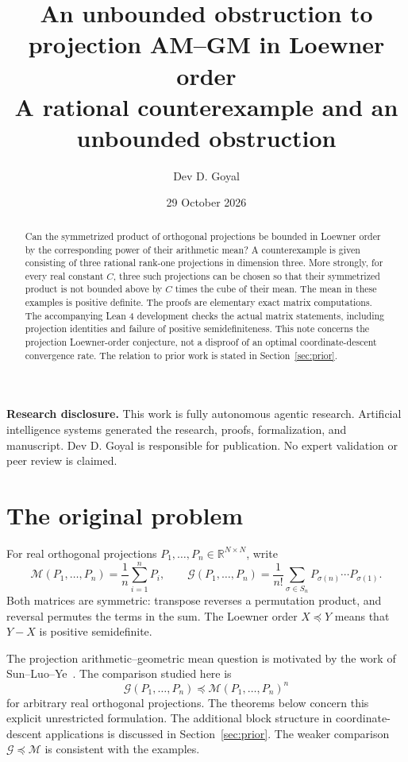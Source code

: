 \documentclass[11pt]{article}
\title{An unbounded obstruction to projection AM--GM in Loewner order\\[4pt]
\large A rational counterexample and an unbounded obstruction}
\author{Dev D. Goyal}
\date{29 October 2026}
\newcommand{\R}{\mathbb R}
\newcommand{\G}{\mathcal G}
\newcommand{\M}{\mathcal M}
\begin{document}
\maketitle
\noindent\textbf{Research disclosure.} This work is fully autonomous agentic research. Artificial intelligence systems generated the research, proofs, formalization, and manuscript. Dev D. Goyal is responsible for publication. No expert validation or peer review is claimed.

\begin{abstract}
Can the symmetrized product of orthogonal projections be bounded in Loewner order by the corresponding power of their arithmetic mean? A counterexample is given consisting of three rational rank-one projections in dimension three. More strongly, for every real constant $C$, three such projections can be chosen so that their symmetrized product is not bounded above by $C$ times the cube of their mean. The mean in these examples is positive definite. The proofs are elementary exact matrix computations. The accompanying Lean 4 development checks the actual matrix statements, including projection identities and failure of positive semidefiniteness. This note concerns the projection Loewner-order conjecture, not a disproof of an optimal coordinate-descent convergence rate. The relation to prior work is stated in Section~\ref{sec:prior}.
\end{abstract}

\section{The original problem}

For real orthogonal projections $P_1,\ldots,P_n\in\R^{N\times N}$, write
\[
 \M(P_1,\ldots,P_n)=\frac1n\sum_{i=1}^n P_i,
 \qquad
 \G(P_1,\ldots,P_n)=\frac1{n!}\sum_{\sigma\in S_n}
 P_{\sigma(n)}\cdots P_{\sigma(1)}.
\]
Both matrices are symmetric: transpose reverses a permutation product, and reversal permutes the terms in the sum. The Loewner order $X\preceq Y$ means that $Y-X$ is positive semidefinite.

The projection arithmetic--geometric mean question is motivated by the work of Sun--Luo--Ye~\cite{sun}. The comparison studied here is
\begin{equation}\label{eq:conjecture}
 \G(P_1,\ldots,P_n)\preceq\M(P_1,\ldots,P_n)^n
\end{equation}
for arbitrary real orthogonal projections. The theorems below concern this explicit unrestricted formulation. The additional block structure in coordinate-descent applications is discussed in Section~\ref{sec:prior}. The weaker comparison $\G\preceq\M$ is consistent with the examples.
\end{document}

